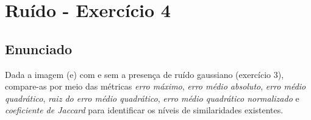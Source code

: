 \documentclass[10pt,a4paper]{article}
\begin{document}
\begin{figure}[H]
    \centering
    \qquad
    \qquad
    \qquad
    \qquad
\end{figure}

\pagebreak

\section{Ruído - Exercício 4}

\subsection{Enunciado}

Dada a imagem (e) com e sem a presença de ruído gaussiano (exercício 3), compare-as por meio das métricas  \textit{erro máximo}, \textit{erro médio absoluto}, \textit{erro médio quadrático}, \textit{raiz do erro médio quadrático}, \textit{erro médio quadrático normalizado} e \textit{coeficiente de Jaccard} para identificar os níveis de similaridades existentes.
\end{document}
